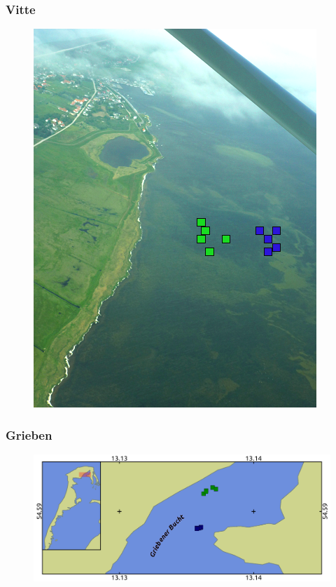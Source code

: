 \documentclass{beamer}
\begin{document}
\begin{frame}
\frametitle{Vitte}
\begin{figure}
\includegraphics[height=0.8\textheight]{images/Fotos/vitte.png}
\end{figure}
\end{frame}

\begin{frame}
\frametitle{Grieben}
\begin{figure}
\includegraphics[scale=0.76]{images/Grieben.png}
\end{figure}
\end{frame}
\end{document}
